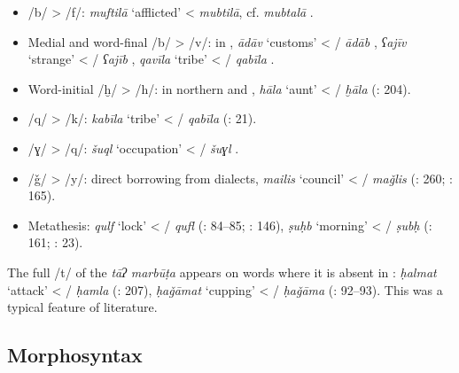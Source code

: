 \documentclass[output=paper]{langsci/langscibook}
\begin{document}
\begin{itemize}
\item[]
/b/ > /f/: \emph{muftilā} ‘afflicted’ <  \textit{mubtilā}, cf.   \textit{mubtalā} \citep{Borjian2017}.

\item[]
Medial and word-final /b/ > /v/: in , \textit{ādāv} ‘customs’ < / \textit{ādāb} \citep[15]{Sarlak2002}, \textit{ʕajīv} ‘strange’ < / \textit{ʕajīb} \citep[25]{Sarlak2002}, \textit{qavīla} ‘tribe’ < / \textit{qabīla} \citep[199]{Sarlak2002}.

\item[]
Word-initial /ḫ/ > /h/: in northern  and , \textit{hāla} ‘aunt’ < / \textit{ḫāla} (\citealt{Īzadpanāh2001}: 204).

\item[]
/q/ > /k/: \textit{kabīla} ‘tribe’ < / \textit{qabīla} (\citealt{NaǧībiFīni2002}: 21).

\item[]
/ɣ/ > /q/: \textit{šuql} ‘occupation’ < / \textit{šuɣl} \citep{Stilo2001}.

\item[]
/ǧ/ > /y/: direct borrowing from   dialects, \textit{mailis} ‘council’ < / \textit{maǧlis} (\citealt{Sarlak2002}: 260; \citealt{Fāẓilī2004}: 165).

\item[]
Metathesis: \textit{qulf} ‘lock’ < / \textit{qufl} (\citealt{Salāmī2004}: 84–85; \citealt{ImāmAhwāzī2000}: 146), \textit{ṣuḥb} ‘morning’ < / \textit{ṣubḥ} (\citealt{Dānišgar1995}: 161; \citealt{NaǧībiFīni2002}: 23).
\end{itemize}

The full /t/ of the \textit{tāʔ} \textit{marbūṭa} appears on words where it is absent in : \textit{ḥalmat} ‘attack’ < / \textit{ḥamla} (\citealt{Īzadpanāh2001}: 207), \textit{ḥaǧāmat} ‘cupping’ < / \textit{ḥaǧāma} (\citealt{Salāmī2004}: 92–93). This was a typical feature of  literature.

\subsection{Morphosyntax}
\end{document}
